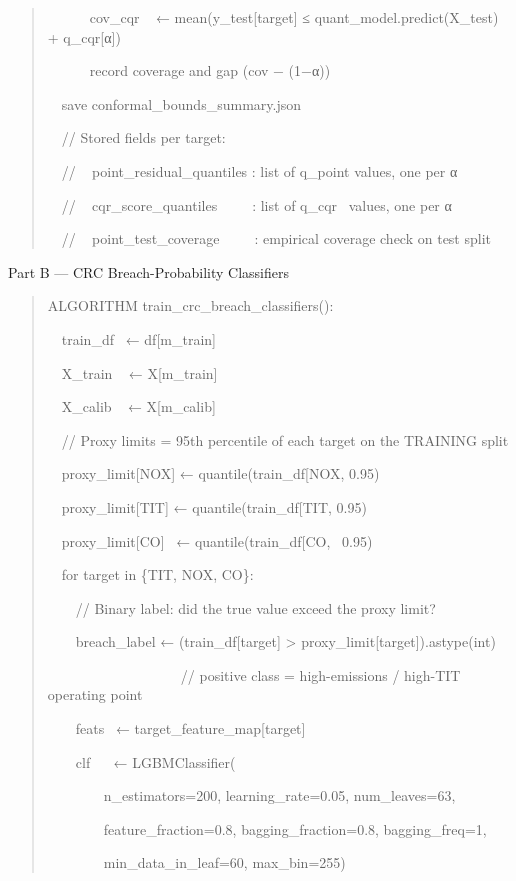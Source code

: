 \documentclass[11pt]{article}
\begin{document}
\begin{quote}
~~~~~~cov\_cqr ~ ← mean(y\_test{[}target{]} ≤
quant\_model.predict(X\_test) + q\_cqr{[}α{]})

~~~~~~record coverage and gap (cov − (1−α))

~~save conformal\_bounds\_summary.json

~~// Stored fields per target:

~~// ~ point\_residual\_quantiles : list of q\_point values, one per α

~~// ~ cqr\_score\_quantiles~ ~ ~ : list of q\_cqr~ values, one per α

~~// ~ point\_test\_coverage~ ~ ~ : empirical coverage check on test
split
\end{quote}

Part B --- CRC Breach-Probability Classifiers

\begin{quote}
ALGORITHM train\_crc\_breach\_classifiers():

~~train\_df~ ← df{[}m\_train{]}

~~X\_train ~ ← X{[}m\_train{]}

~~X\_calib ~ ← X{[}m\_calib{]}

~~// Proxy limits = 95th percentile of each target on the TRAINING split

~~proxy\_limit{[}NOX{]} ←
quantile(train\_df{[}\textquotesingle NOX\textquotesingle{]}, 0.95)

~~proxy\_limit{[}TIT{]} ←
quantile(train\_df{[}\textquotesingle TIT\textquotesingle{]}, 0.95)

~~proxy\_limit{[}CO{]}~ ←
quantile(train\_df{[}\textquotesingle CO\textquotesingle{]},~ 0.95)

~~for target in \{TIT, NOX, CO\}:

~~~~// Binary label: did the true value exceed the proxy limit?

~~~~breach\_label ← (train\_df{[}target{]} \textgreater{}
proxy\_limit{[}target{]}).astype(int)

~~~~~~~~~~~~~~~~~~~// positive class = high-emissions / high-TIT
operating point

~~~~feats~ ← target\_feature\_map{[}target{]}

~~~~clf~ ~ ← LGBMClassifier(

~~~~~~~~n\_estimators=200, learning\_rate=0.05, num\_leaves=63,

~~~~~~~~feature\_fraction=0.8, bagging\_fraction=0.8, bagging\_freq=1,

~~~~~~~~min\_data\_in\_leaf=60, max\_bin=255)


\end{quote}
\end{document}
